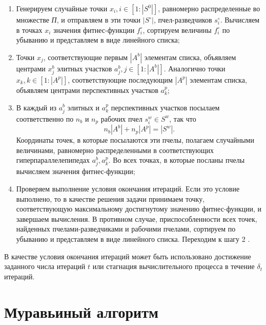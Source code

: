 \begin{enumerate}
	\item Генерируем случайные точки $x_i, i \in [1:|S^0|]$, равномерно распределенные во множестве \textit{П}, и отправляем в эти точки $|S^{\circ}|$, пчел-разведчиков $s_i^{\circ}$. Вычисляем в точках $x_i$ значения фитнес-функции $f_i^{\circ}$, сортируем величины $f_i^{\circ}$ по убыванию и представляем в виде линейного списка;
	\item Точки $x_j$, соответствующие первым $|A^b|$ элементам списка, объявляем центрами $x_j^b$ элитных участков $a_j^b, j \in [1:|A^b|]$. Аналогично точки $x_k, k \in [1:|A^p|]$, соответствующие последующим $|A^p|$ элементам списка, объявляем центрами перспективных участков $a_k^p$;
	\item В каждый из $a_j^b$ элитных и $a_k^p$ перспективных участков посылаем соответственно по $n_b$ и $n_p$ рабочих пчел $s_i^w \in S^w$, так что $$n_b |A^b| + n_p |A^p| = |S^w|.$$  Координаты точек, в которые посылаются эти пчелы, полагаем случайными величинами, равномерно распределенными в соответствующих гиперпараллелепипедах $a_j^b, a_k^p$. Во всех точках, в которые посланы пчелы вычисляем значения фитнес-функции;
	\item Проверяем выполнение условия окончания итераций. Если это условие выполнено, то в качестве решения задачи принимаем точку, соответствующую максимальному достигнутому значению фитнес-функции, и завершаем вычисления. В противном случае, приспособленности всех точек, найденных пчелами-разведчиками и рабочими пчелами, сортируем по убыванию и представляем в виде линейного списка. Переходим к шагу 2 \cite{karpenko} \cite{yang2}.
\end{enumerate}

В качестве условия окончания итераций может быть использовано достижение заданного числа итераций $t$ или стагнация вычислительного процесса в течение $\delta_t$ итераций.

\section{Муравьиный алгоритм} 
